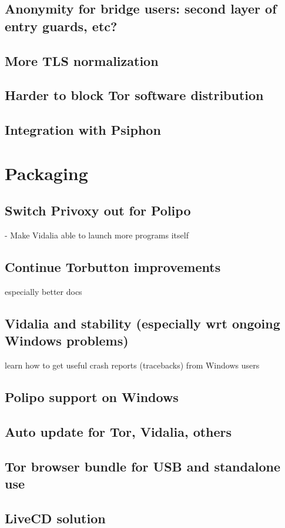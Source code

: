 \documentclass{article}
\begin{document}
\subsection{Anonymity for bridge users: second layer of entry guards, etc?}
\subsection{More TLS normalization}
\subsection{Harder to block Tor software distribution}
\subsection{Integration with Psiphon}
\section{Packaging}
\subsection{Switch Privoxy out for Polipo}
      - Make Vidalia able to launch more programs itself
\subsection{Continue Torbutton improvements}
      especially better docs
\subsection{Vidalia and stability (especially wrt ongoing Windows problems)}
      learn how to get useful crash reports (tracebacks) from Windows users
\subsection{Polipo support on Windows}
\subsection{Auto update for Tor, Vidalia, others}
\subsection{Tor browser bundle for USB and standalone use}
\subsection{LiveCD solution}
\end{document}
